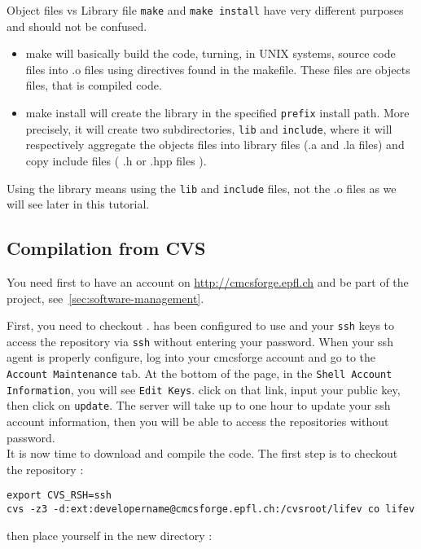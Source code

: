 \begin{hint}{Object files vs Library file}
\verb|make| and \verb|make install| have very different purposes and should not be confused.
\begin{itemize}
\item make will basically build the code, turning, in UNIX systems, source code
files into .o files using directives found in the makefile. These files are objects files, that is compiled code.
\item make install will create the library in the specified \verb|prefix| install path.
More precisely, it will create two subdirectories, \verb|lib| and \verb|include|, where
it will respectively aggregate the objects files into library files (.a and .la files)
and copy include files ( .h or .hpp files ).
\end{itemize}
Using the library means using the \verb|lib| and \verb|include| files, not the .o files as we will see later
in this tutorial.
\end{hint}


\subsection{Compilation from CVS}
\label{sec:compile-cvs}
You need first to have an account on \url{http://cmcsforge.epfl.ch} and
be part of the \lifev project, see~\ref{sec:software-management}.

\noindent First, you need to checkout \lifev.  has
been configured to use  and your \verb!ssh! keys to
access the repository via \verb!ssh! without entering your password.
When your ssh agent is properly configure, log into your cmcsforge account and
go to the \verb!Account Maintenance! tab. At the bottom of the page, in the
\verb!Shell Account Information!, you will see \verb!Edit Keys!. click on that link,
input your public key, then click on \verb!update!. The server will take up to one
hour to update your ssh account information, then you will be able to access the
repositories without password.\\

It is now time to download and compile the code. The first step is to checkout the repository :

\begin{verbatim}
export CVS_RSH=ssh
cvs -z3 -d:ext:developername@cmcsforge.epfl.ch:/cvsroot/lifev co lifev
\end{verbatim}

then place yourself in the new directory :

